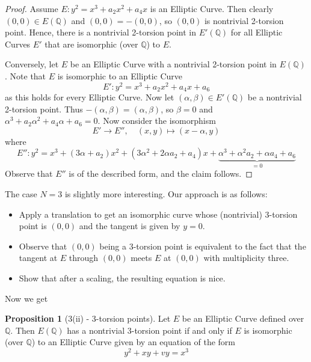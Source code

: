 \documentclass{scrartcl}
\newcommand{\Q}{\mathbb{Q}}
\theoremstyle{definition}
\newtheorem{prop}[subsection]{Proposition}
\begin{document}
\begin{proof}
    Assume $E: y^2 = x^3 + a_2 x^2 + a_4 x$ is an Elliptic Curve.
    Then clearly $(0, 0) \in E(\Q)$ and $(0, 0) = -(0, 0)$, so $(0, 0)$ is nontrivial 2-torsion point.
    Hence, there is a nontrivial 2-torsion point in $E'(\Q)$ for all Elliptic Curves $E'$ that are isomorphic (over $\Q$) to $E$.

    Conversely, let $E$ be an Elliptic Curve with a nontrivial 2-torsion point in $E(\Q)$.
    Note that $E$ is isomorphic to an Elliptic Curve 
    \begin{equation*}
        E': y^2 = x^3 + a_2 x^2 + a_4 x + a_6
    \end{equation*}
    as this holds for every Elliptic Curve.
    Now let $(\alpha, \beta) \in E'(\Q)$ be a nontrivial 2-torsion point.
    Thus $-(\alpha, \beta) = (\alpha, \beta)$, so $\beta = 0$ and $\alpha^3 + a_2 \alpha^2 + a_4 \alpha + a_6 = 0$.
    Now consider the isomorphism
    \begin{equation*}
        E' \to E'', \quad (x, y) \mapsto (x - \alpha, y)
    \end{equation*}
    where
    \begin{equation*}
        E'': y^2 = x^3 + (3\alpha + a_2) x^2 + (3\alpha^2 + 2\alpha a_2 + a_4)x + \underbrace{\alpha^3 + \alpha^2a_2 + \alpha a_4 + a_6}_{= 0}
    \end{equation*}
    Observe that $E''$ is of the described form, and the claim follows. 
\end{proof}
The case $N = 3$ is slightly more interesting.
Our approach is as follows:
\begin{itemize}
    \item Apply a translation to get an isomorphic curve whose (nontrivial) 3-torsion point is $(0, 0)$ and the tangent is given by $y = 0$.
    \item Observe that $(0, 0)$ being a 3-torsion point is equivalent to the fact that the tangent at $E$ through $(0, 0)$ meets $E$ at $(0, 0)$ with multiplicity three.
    \item Show that after a scaling, the resulting equation is nice.
\end{itemize}
Now we get
\begin{prop}[3(ii) - 3-torsion points]
    Let $E$ be an Elliptic Curve defined over $\Q$.
    Then $E(\Q)$ has a nontrivial 3-torsion point if and only if $E$ is isomorphic (over $\Q$) to an Elliptic Curve given by an equation of the form
    \begin{equation*}
        y^2 + x y + v y = x^3
    \end{equation*}
\end{prop}
\end{document}
